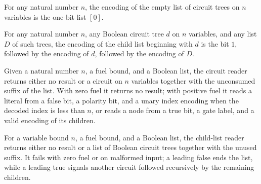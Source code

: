 \begin{theorem}
\label{BoolCircuit.encodeChildren_nil}
\leanok
{}
For any natural number $n$, the encoding of the empty list of circuit trees on $n$
variables is the one-bit list $[0]$.
\end{theorem}

\begin{theorem}
\label{BoolCircuit.encodeChildren_cons}
\leanok
{}
For any natural number $n$, any Boolean circuit tree $d$ on $n$ variables, and any list
$D$ of such trees, the encoding of the child list beginning with $d$ is the bit $1$,
followed by the encoding of $d$, followed by the encoding of $D$.
\end{theorem}

\begin{definition}
\label{BoolCircuit.readCircuit}
\leanok
{}
Given a natural number $n$, a fuel bound, and a Boolean list, the circuit reader returns
either no result or a circuit on $n$ variables together with the unconsumed suffix of
the list. With zero fuel it returns no result; with positive fuel it reads a literal
from a false bit, a polarity bit, and a unary index encoding when the decoded index is
less than $n$, or reads a node from a true bit, a gate label, and a valid encoding of
its children.
\end{definition}

\begin{definition}
\label{BoolCircuit.readChildren}
\leanok
{}
For a variable bound $n$, a fuel bound, and a Boolean list, the child-list reader
returns either no result or a list of Boolean circuit trees together with the unused
suffix. It fails with zero fuel or on malformed input; a leading false ends the list,
while a leading true signals another circuit followed recursively by the remaining
children.
\end{definition}

